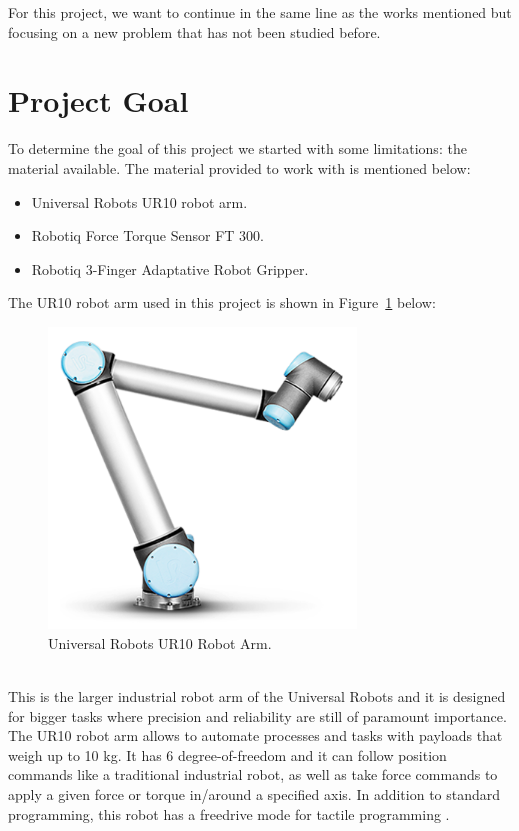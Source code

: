 For this project, we want to continue in the same line as the works mentioned but focusing on a new problem that has not been studied before. 

\section{Project Goal}
To determine the goal of this project we started with some limitations: the material available. The material provided to work with is mentioned below:
\begin{itemize}
	\item Universal Robots UR10 robot arm.
	\item Robotiq Force Torque Sensor FT 300.
	\item Robotiq 3-Finger Adaptative Robot Gripper.
\end{itemize}

The UR10 robot arm used in this project is shown in Figure~\ref{fig:ur10} below:
\begin{figure}[h!]
	\centering
	\includegraphics[height=80mm]{chapters/figures/intro/ur10.jpg}
	\caption{Universal Robots UR10 Robot Arm.}
	\label{fig:ur10}
\end{figure}\\
This is the larger industrial robot arm of the Universal Robots and it is designed for bigger tasks where precision and reliability are still of paramount importance. The UR10 robot arm allows to automate processes and tasks with payloads that weigh up to 10 kg. It has 6 degree-of-freedom and it can follow position commands like a traditional industrial robot, as well as take force commands to apply a given force or torque in/around a specified axis. In addition to standard programming, this robot has a freedrive mode for tactile programming \cite{universalrobots2014ur10}.

